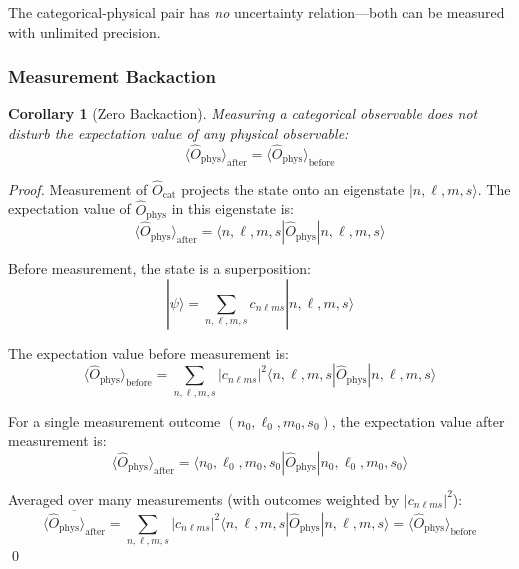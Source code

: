 \documentclass[twocolumn,10pt]{article}
\newtheorem{corollary}[theorem]{Corollary}
\theoremstyle{remark}
\begin{document}
The categorical-physical pair has \textit{no} uncertainty relation—both can be measured with unlimited precision.

\subsubsection{Measurement Backaction}

\begin{corollary}[Zero Backaction]
\label{cor:zero_backaction}
Measuring a categorical observable does not disturb the expectation value of any physical observable:
\begin{equation}
    \langle \hat{O}_{\text{phys}} \rangle_{\text{after}} = \langle \hat{O}_{\text{phys}} \rangle_{\text{before}}
    \label{eq:zero_backaction}
\end{equation}
\end{corollary}

\begin{proof}
Measurement of $\hat{O}_{\text{cat}}$ projects the state onto an eigenstate $|n, \ell, m, s\rangle$. The expectation value of $\hat{O}_{\text{phys}}$ in this eigenstate is:
\begin{equation}
    \langle \hat{O}_{\text{phys}} \rangle_{\text{after}} = \langle n, \ell, m, s | \hat{O}_{\text{phys}} | n, \ell, m, s \rangle
    \label{eq:expectation_after}
\end{equation}

Before measurement, the state is a superposition:
\begin{equation}
    |\psi\rangle = \sum_{n, \ell, m, s} c_{n\ell ms} |n, \ell, m, s\rangle
    \label{eq:state_before}
\end{equation}

The expectation value before measurement is:
\begin{equation}
    \langle \hat{O}_{\text{phys}} \rangle_{\text{before}} = \sum_{n, \ell, m, s} |c_{n\ell ms}|^2 \langle n, \ell, m, s | \hat{O}_{\text{phys}} | n, \ell, m, s \rangle
    \label{eq:expectation_before}
\end{equation}

For a single measurement outcome $(n_0, \ell_0, m_0, s_0)$, the expectation value after measurement is:
\begin{equation}
    \langle \hat{O}_{\text{phys}} \rangle_{\text{after}} = \langle n_0, \ell_0, m_0, s_0 | \hat{O}_{\text{phys}} | n_0, \ell_0, m_0, s_0 \rangle
    \label{eq:expectation_single_outcome}
\end{equation}

Averaged over many measurements (with outcomes weighted by $|c_{n\ell ms}|^2$):
\begin{equation}
    \overline{\langle \hat{O}_{\text{phys}} \rangle_{\text{after}}} = \sum_{n, \ell, m, s} |c_{n\ell ms}|^2 \langle n, \ell, m, s | \hat{O}_{\text{phys}} | n, \ell, m, s \rangle = \langle \hat{O}_{\text{phys}} \rangle_{\text{before}}
\end{equation}
\qed
\end{proof}
\end{document}
